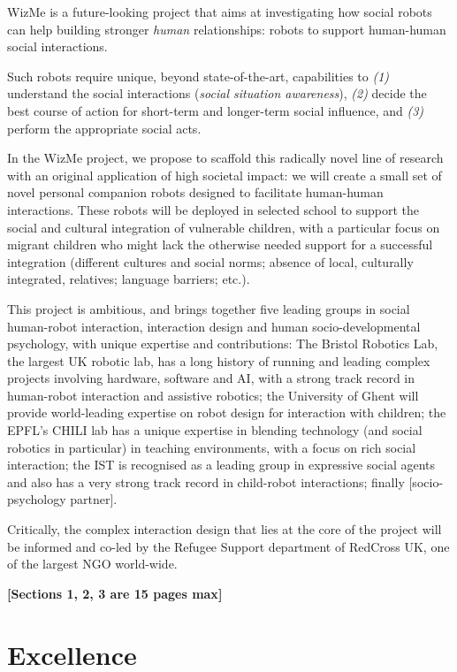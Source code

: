 \documentclass[]{article}
\begin{document}
WizMe is a future-looking project that aims at investigating how social
robots can help building stronger \emph{human} relationships: robots to
support human-human social interactions.

Such robots require unique, beyond state-of-the-art, capabilities to
\emph{(1)} understand the social interactions (\emph{social situation
awareness}), \emph{(2)} decide the best course of action for short-term
and longer-term social influence, and \emph{(3)} perform the appropriate
social acts.

In the WizMe project, we propose to scaffold this radically novel line
of research with an original application of high societal impact: we
will create a small set of novel personal companion robots designed to
facilitate human-human interactions. These robots will be deployed in
selected school to support the social and cultural integration of
vulnerable children, with a particular focus on migrant children who
might lack the otherwise needed support for a successful integration
(different cultures and social norms; absence of local, culturally
integrated, relatives; language barriers; etc.).

This project is ambitious, and brings together five leading groups in
social human-robot interaction, interaction design and human
socio-developmental psychology, with unique expertise and contributions:
The Bristol Robotics Lab, the largest UK robotic lab, has a long history
of running and leading complex projects involving hardware, software and
AI, with a strong track record in human-robot interaction and assistive
robotics; the University of Ghent will provide world-leading expertise
on robot design for interaction with children; the EPFL's CHILI lab has
a unique expertise in blending technology (and social robotics in
particular) in teaching environments, with a focus on rich social
interaction; the IST is recognised as a leading group in expressive
social agents and also has a very strong track record in child-robot
interactions; finally {[}socio-psychology partner{]}.

Critically, the complex interaction design that lies at the core of the
project will be informed and co-led by the Refugee Support department of
RedCross UK, one of the largest NGO world-wide.

\pagebreak

\textbf{{[}Sections 1, 2, 3 are 15 pages max{]}}

\hypertarget{excellence}{%
\section{Excellence}\label{excellence}}
\end{document}
